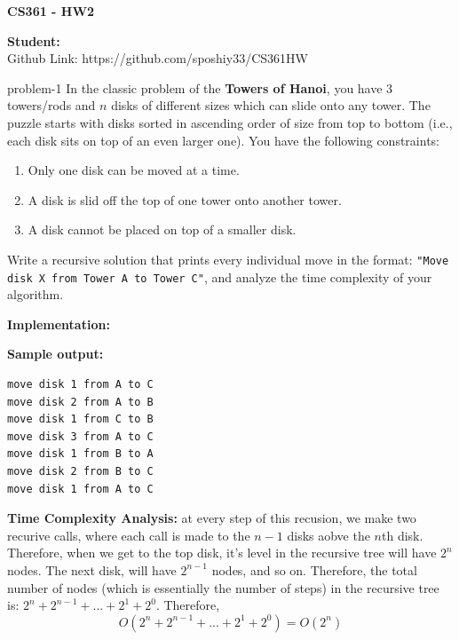 \documentclass[letterpaper, 11pt]{extarticle}
\begin{document}
\begin{Large}
    \textsf{\textbf{CS361 - HW2}}
\end{Large}

\vspace{1ex}

\textsf{\textbf{Student:}} \\

Github Link: https://github.com/sposhiy33/CS361HW

\vspace{2ex}


\begin{problem}{}{problem-1}
    In the classic problem of the \textbf{Towers of Hanoi}, you have 3 towers/rods and $n$ disks of different sizes which can slide onto any tower. The puzzle starts with disks sorted in ascending order of size from top to bottom (i.e., each disk sits on top of an even larger one). You have the following constraints:
    \begin{enumerate}
        \item Only one disk can be moved at a time.
        \item A disk is slid off the top of one tower onto another tower.
        \item A disk cannot be placed on top of a smaller disk.
    \end{enumerate}
    Write a recursive solution that prints every individual move in the format: \texttt{"Move disk X from Tower A to Tower C"}, and analyze the time complexity of your algorithm.
\end{problem}

\vspace{1ex}
\noindent\textbf{Implementation:}


\vspace{0.5ex}
\noindent\textbf{Sample output:}
\begin{lstlisting}[numbers=none, frame=single, basicstyle=\ttfamily\small]
move disk 1 from A to C
move disk 2 from A to B
move disk 1 from C to B
move disk 3 from A to C
move disk 1 from B to A
move disk 2 from B to C
move disk 1 from A to C
\end{lstlisting}


\textbf{Time Complexity Analysis:} at every step of this recusion, we make two recurive calls, where each call is made to the $n-1$ disks aobve the $n$th disk. Therefore, when we get to the top disk, it's level in the recursive tree will have $2^n$ nodes. The next disk, will have $2^{n-1}$ nodes, and so on. Therefore, the total number of nodes (which is essentially the number of steps) in the recursive tree is: $2^n + 2^{n-1} + ... + 2^1 + 2^0$. Therefore, $$ O(2^n + 2^{n-1} + ... + 2^1 + 2^0) = O(2^n)$$
\end{document}
